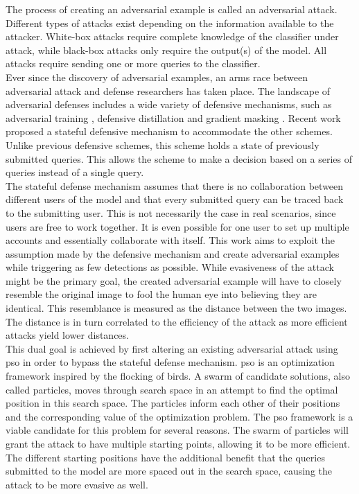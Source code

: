 The process of creating an adversarial example is called an adversarial attack. Different types of attacks exist depending on the information available to the attacker. White-box attacks require complete knowledge of the classifier under attack, while black-box attacks only require the output(s) of the model. All attacks require sending one or more queries to the classifier.\\

Ever since the discovery of adversarial examples, an arms race between adversarial attack and defense researchers has taken place. The landscape of adversarial defenses includes a wide variety of defensive mechanisms, such as adversarial training \cite{FGSM}, defensive distillation \cite{defensive_distillation} and gradient masking \cite{not_useful_gradients, obfuscated_gradients}. Recent work proposed a stateful defensive mechanism \cite{chen_stateful_2019} to accommodate the other schemes. Unlike previous defensive schemes, this scheme holds a state of previously submitted queries. This allows the scheme to make a decision based on a series of queries instead of a single query.\\

The stateful defense mechanism assumes that there is no collaboration between different users of the model and that every submitted query can be traced back to the submitting user. This is not necessarily the case in real scenarios, since users are free to work together. It is even possible for one user to set up multiple accounts and essentially collaborate with itself. This work aims to exploit the assumption made by the defensive mechanism and create adversarial examples while triggering as few detections as possible. While evasiveness of the attack might be the primary goal, the created adversarial example will have to closely resemble the original image to fool the human eye into believing they are identical. This resemblance is measured as the distance between the two images. The distance is in turn correlated to the efficiency of the attack as more efficient attacks yield lower distances.\\

This dual goal is achieved by first altering an existing adversarial attack using \gls{pso} in order to bypass the stateful defense mechanism. \gls{pso} is an optimization framework inspired by the flocking of birds. A swarm of candidate solutions, also called particles, moves through search space in an attempt to find the optimal position in this search space. The particles inform each other of their positions and the corresponding value of the optimization problem. The \gls{pso} framework is a viable candidate for this problem for several reasons. The swarm of particles will grant the attack to have multiple starting points, allowing it to be more efficient. The different starting positions have the additional benefit that the queries submitted to the model are more spaced out in the search space, causing the attack to be more evasive as well.\\ 

